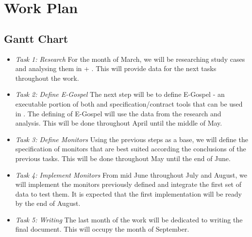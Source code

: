 
%

\chapter{Work Plan}
\label{cha:work_plan}

\section{Gantt Chart}
\label{section:gantt_chart}

\begin{itemize}
    \setlength\itemsep{0bp}
    \item{\emph{Task 1: Research}}\hspace{1em}
    For the month of March, we will be researching study cases and analysing them in 
    \ortac + \cameleer. This will provide data for the next tasks throughout the work.
    \item{\emph{Task 2: Define E-Gospel}}\hspace{1em}
    The next step will be to define E-Gospel - an executable portion of both \ocaml and 
    specification/contract tools that can be used in \gospellang. The defining of E-Gospel 
    will use the data from the research and analysis. This will be done throughout April 
    until the middle of May.
    \item{\emph{Task 3: Define Monitors}}\hspace{1em}
    Using the previous steps as a base, we will define the specification of monitors that 
    are best suited according the conclusions of the previous tasks. This will be done 
    throughout May until the end of June.
    \item{\emph{Task 4: Implement Monitors}}\hspace{1em}
    From mid June throughout July and August, we will implement the monitors previously defined 
    and integrate the first set of data to test them. It is expected that the first 
    implementation will be ready by the end of August.
    \item{\emph{Task 5: Writing}}\hspace{1em}
    The last month of the work will be dedicated to writing the final document. This will
    occupy the month of September.
\end{itemize}

